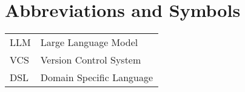 \chapter*{Abbreviations and Symbols}

\begin{flushleft}
\begin{tabular}{l p{0.8\linewidth}}
LLM      & Large Language Model\\
VCS     & Version Control System\\
DSL     & Domain Specific Language\\
\end{tabular}
\end{flushleft}


